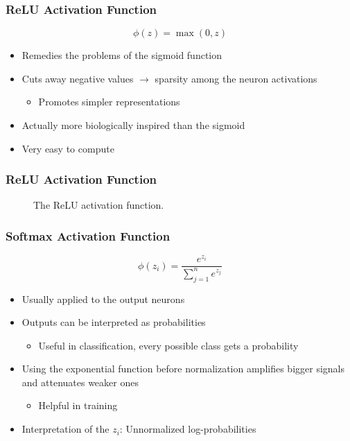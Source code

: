 \begin{frame}
  \frametitle{ReLU Activation Function}
  \begin{equation}
    \phi(z) = \max(0, z)
  \end{equation}
  \begin{itemize}
    \item Remedies the problems of the sigmoid function
    \item Cuts away negative values \(\rightarrow\) sparsity among the
      neuron activations
      \begin{itemize}
        \item Promotes simpler representations
      \end{itemize}
    \item Actually more biologically inspired than the sigmoid
    \item Very easy to compute
  \end{itemize}
\end{frame}

\begin{frame}
  \frametitle{ReLU Activation Function}
  \begin{figure}
    \resizebox{.6\textwidth}{!}{}
    \caption{The ReLU activation function.}
  \end{figure}
\end{frame}

\begin{frame}
  \frametitle{Softmax Activation Function}
  \begin{equation}
    \phi(z_i) = \frac{e^{z_i}}{\sum_{j=1}^{n}{e^{z_j}}}
  \end{equation}
  \begin{itemize}
    \item Usually applied to the output neurons
    \item Outputs can be interpreted as probabilities
      \begin{itemize}
        \item Useful in classification, every possible class gets a
          probability
      \end{itemize}
    \item Using the exponential function before normalization
      amplifies bigger signals and attenuates weaker ones
      \begin{itemize}
        \item Helpful in training
      \end{itemize}
    \item Interpretation of the \(z_i\): Unnormalized
      log-probabilities
  \end{itemize}
\end{frame}

